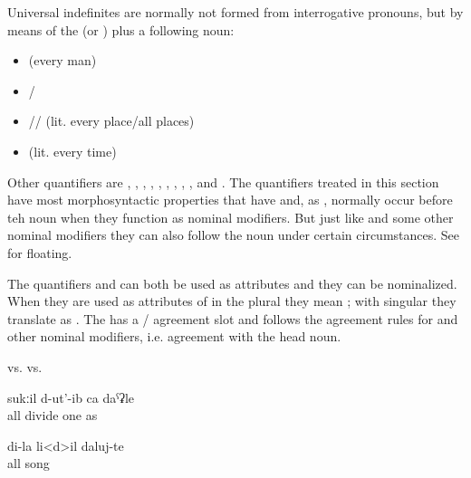 Universal indefinites are normally not formed from interrogative pronouns, but by means of the    (or  ) plus a following noun:
%
\begin{itemize}
	\item	{}  (every man)
	\item	{}\slash{} 
	\item	{}\slash{}\slash{}  (lit. every place\slash all places)
	\item	{}  (lit. every time)
\end{itemize}
%
Other quantifiers are ,  , , , ,  , , ,  , and  . The quantifiers treated in this section have most morphosyntactic properties that  have and, as , normally occur before teh noun when they function as nominal modifiers. But just like  and some other nominal modifiers they can also follow the noun under certain circumstances. See  for  floating. 

The quantifiers  and  can both be used as attributes and they can be nominalized. When they are used as attributes of  in the plural they mean ; with singular  they translate as . The   has a / agreement slot and follows the agreement rules for  and other nominal modifiers, i.e. agreement with the head noun.
%
\begin{exe}
	\ex	\label{ex:all girls all houses}
	\begin{xlist}
		\TabPositions{10.5em,12.5em}
		\ex	{} 		\tab	vs.	\tab	{} 
		\ex	{}		\tab	vs.	\tab	{} 
	\end{xlist}

	\ex	\label{ex:He divided all (the bread) like one (i.e. everyone got the same amount of bread)}
	\gll	sukːil	d-ut'-ib	ca	daˁʡle\\
		all	divide	one	as\\
	\glt	{}

	\ex	
	\gll	di-la	li<d>il	daluj-te\\
			all	song\\
	\glt	{}
\end{exe}

